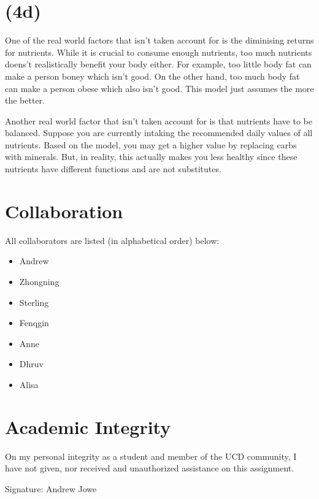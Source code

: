\documentclass[17pt]{extarticle}
\begin{document}
\section*{(4d)}
One of the real world factors that isn't taken account for is the diminising returns for nutrients. While it is crucial to consume enough nutrients, too much nutrients doens't realistically benefit your body either. For example, too little body fat can make a person boney which isn't good. On the other hand, too much body fat can make a person obese which also isn't good. This model just assumes the more the better.

\bigskip Another real world factor that isn't taken account for is that nutrients have to be balanced. Suppose you are currently intaking the recommended daily values of all nutrients. Based on the model, you may get a higher value by replacing carbs with minerals. But, in reality, this actually makes you less healthy since these nutrients have different functions and are not substitutes.

\section*{Collaboration}
All collaborators are listed (in alphabetical order) below:
\begin{itemize}
    \item Andrew
    \item Zhongning
    \item Sterling
    \item Fenqgin
    \item Anne
    \item Dhruv
    \item Alisa
\end{itemize}

\section*{Academic Integrity}
On my personal integrity as a student and member of the UCD community, I have not given, nor received and unauthorized assistance on this assignment.

Signature: Andrew Jowe
\end{document}

